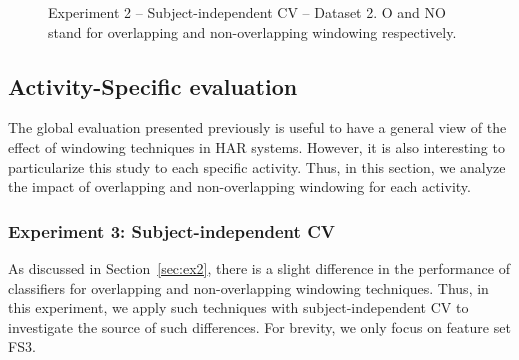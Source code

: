 \documentclass[sensors,article,submit,moreauthors,pdftex]{Definitions/mdpi}
\begin{document}
\begin{figure}[htp]
   
   \caption{Experiment 2 -- Subject-independent CV -- Dataset 2. O and NO stand for overlapping and non-overlapping windowing respectively.}
    \label{fig:exp2_ds2}
    
\end{figure}

\subsection{Activity-Specific evaluation}\label{per_activity_evaluation}
The global evaluation presented previously is useful to have a general view of the effect of windowing techniques in HAR systems. However, it is also interesting to particularize this study to each specific activity. Thus, in this section, we analyze the impact of overlapping and non-overlapping windowing for each activity.

\subsubsection{Experiment 3: Subject-independent CV}
As discussed in Section~\ref{sec:ex2}, there is a slight difference in the performance of classifiers for overlapping and non-overlapping windowing techniques. Thus, in this experiment, we apply such techniques with subject-independent CV to investigate the source of such differences. 
For brevity, we only focus on feature set FS3.
\end{document}

